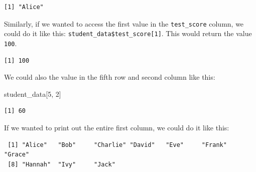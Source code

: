 \documentclass[
  letterpaper,
  DIV=11,
  numbers=noendperiod]{scrreprt}
\newenvironment{Shaded}{\begin{snugshade}}{\end{snugshade}}
\newcommand{\DecValTok}[1]{\textcolor[rgb]{0.68,0.00,0.00}{#1}}
\newcommand{\NormalTok}[1]{\textcolor[rgb]{0.00,0.23,0.31}{#1}}
\newcommand{\SpecialCharTok}[1]{\textcolor[rgb]{0.37,0.37,0.37}{#1}}
\begin{document}
\begin{Shaded}
\end{Shaded}

\begin{verbatim}
[1] "Alice"
\end{verbatim}

Similarly, if we wanted to access the first value in the
\texttt{test\_score} column, we could do it like this:
\texttt{student\_data\$test\_score{[}1{]}}. This would return the value
\texttt{100}.

\begin{Shaded}
\end{Shaded}

\begin{verbatim}
[1] 100
\end{verbatim}

We could also the value in the fifth row and second column like this:

\begin{Shaded}
\begin{Highlighting}[]
\NormalTok{student\_data[}\DecValTok{5}\NormalTok{, }\DecValTok{2}\NormalTok{]}
\end{Highlighting}
\end{Shaded}

\begin{verbatim}
[1] 60
\end{verbatim}

If we wanted to print out the entire first column, we could do it like
this:

\begin{Shaded}
\end{Shaded}

\begin{verbatim}
 [1] "Alice"   "Bob"     "Charlie" "David"   "Eve"     "Frank"   "Grace"  
 [8] "Hannah"  "Ivy"     "Jack"   
\end{verbatim}
\end{document}
